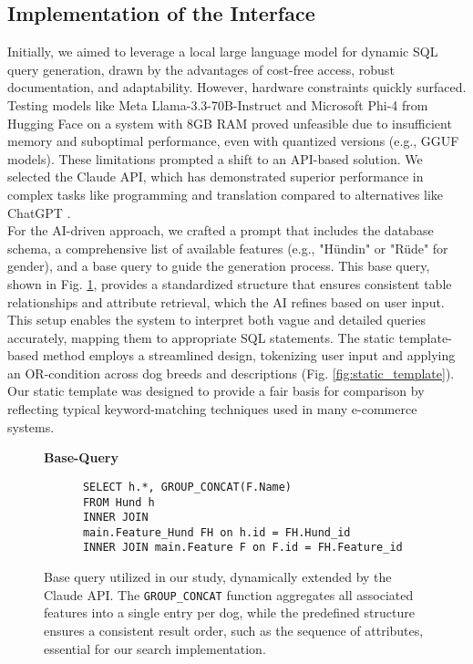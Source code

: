 \documentclass[../../submission.tex]{subfiles}
\begin{document}
\subsection{Implementation of the Interface}
Initially, we aimed to leverage a local large language model for dynamic SQL query generation, drawn by the advantages of cost-free access, 
robust documentation, and adaptability. However, hardware constraints quickly surfaced. Testing models like Meta Llama-3.3-70B-Instruct \cite{MetallamaLlama3370BInstructHugging2024} and Microsoft Phi-4 \cite{MicrosoftPhi4Hugging2025} from Hugging Face on a system with 8GB RAM proved unfeasible due to insufficient memory and suboptimal performance, even with quantized versions (e.g., GGUF models). These limitations prompted a shift to an API-based solution. We selected the Claude API, which has demonstrated superior performance in complex tasks like programming and translation compared to alternatives like ChatGPT \cite{soboEvaluatingLLMsCode2025}.\\
For the AI-driven approach, we crafted a prompt that includes the database schema, a comprehensive list of available features (e.g., "Hündin" or "Rüde" for gender), 
and a base query to guide the generation process. This base query, shown in Fig. \ref{fig:base_query}, provides a standardized structure that ensures consistent 
table relationships and attribute retrieval, which the AI refines based on user input. This setup enables the system to interpret both vague and detailed queries 
accurately, mapping them to appropriate SQL statements. The static template-based method employs a 
streamlined design, tokenizing user input and applying an OR-condition across dog breeds 
and descriptions (Fig. \ref{fig:static_template}). 
Our static template was designed to provide a fair basis for comparison by reflecting 
typical keyword-matching techniques used in many e-commerce systems.
\begin{figure}[h]
   \centering
   \textbf{Base-Query}\par\medskip
   \begin{lstlisting}
      SELECT h.*, GROUP_CONCAT(F.Name) 
      FROM Hund h 
      INNER JOIN 
      main.Feature_Hund FH on h.id = FH.Hund_id 
      INNER JOIN main.Feature F on F.id = FH.Feature_id
   \end{lstlisting}
   \caption{Base query utilized in our study, dynamically extended by the Claude API. The \texttt{GROUP\_CONCAT} function aggregates all associated features into a single entry per dog, while the predefined structure ensures a consistent result order, such as the sequence of attributes, essential for our search implementation.}
   \label{fig:base_query} %
\end{figure}
\end{document}
